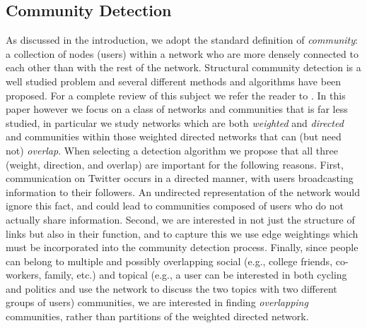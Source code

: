 \documentclass[10pt,letterpaper]{article}
\begin{document}
\subsection{Community Detection}

As discussed in the introduction, we adopt the standard definition of \emph{community}: a collection of nodes (users) within a network who are more densely connected to each other than with the rest of the network. Structural community detection is a well studied problem and several different methods and algorithms have been proposed. For a complete review of this subject we refer the reader to \cite{porter2009communities, fortunato2010community}. In this paper however we focus on a class of networks and communities that is far less studied, in particular we study networks which are both \textit{weighted} and \textit{directed} and communities within those weighted directed networks that can (but need not) \emph{overlap}. When selecting a detection algorithm we propose that all three (weight, direction, and overlap) are important for the following reasons. First, communication on Twitter occurs in a directed manner, with users broadcasting information to their followers. An undirected representation of the network would ignore this fact, and could lead to communities composed of users who do not actually share information. Second, we are interested in not just the structure of links but also in their function, and to capture this we use edge weightings which must be incorporated into the community detection process. Finally, since people can belong to multiple and possibly overlapping social (e.g., college friends, co-workers, family, etc.) and topical (e.g., a user can be interested in both cycling and politics and use the network to discuss the two topics with two different groups of users) communities, we are interested in finding \textit{overlapping} communities, rather than partitions of the weighted directed network. 
\end{document}
